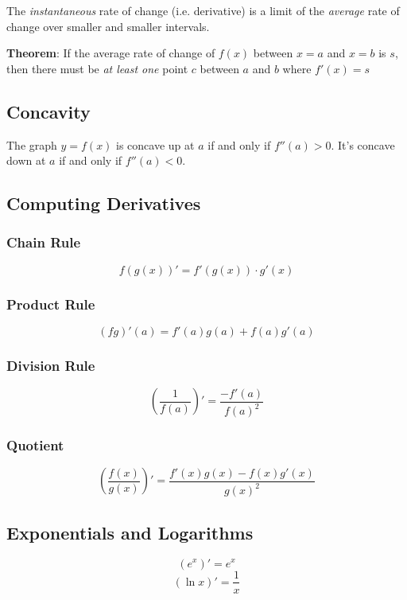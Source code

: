 \documentclass[12pt, a4paper]{scrartcl}
\begin{document}
The \textit{instantaneous} rate of change (i.e. derivative) is a limit of the \textit{average} rate of change over smaller and smaller intervals.\par
\textbf{Theorem}: If the average rate of change of $f(x)$ between $x = a$ and $x = b$ is $s$, then there must be \textit{at least one} point $c$ between $a$ and $b$ where $f'(x)=s$

\subsection{Concavity}
\label{sec:derivatives:concavity}

The graph $y = f(x)$ is concave up at $a$ if and only if  $f''(a) > 0$.	It's concave down at $a$ if and only if $f''(a) < 0$.

\subsection{Computing Derivatives}
\label{sec:derivatives:computing}

\subsubsection{Chain Rule}
\label{sec:derivatives:computing:chain_rule}
$$f(g(x))' = f'(g(x)) \cdot g'(x)$$

\subsubsection{Product Rule}
\label{sec:derivatives:computing:product}

$$(fg)'(a)=f'(a)g(a) + f(a)g'(a)$$

\subsubsection{Division Rule}
\label{sec:derivatives:computing:division}

$$(\dfrac{1}{f(a)})' = \dfrac{-f'(a)}{f(a)^2}$$

\subsubsection{Quotient}
\label{sec:derivatives:computing:quotient}

$$(\dfrac{f(x)}{g(x)})'=\dfrac{f'(x)g(x) - f(x)g'(x)}{g(x)^2}$$

\subsection{Exponentials and Logarithms}
\label{sec:derivatives:exp}
$$(e^x)' = e^x$$
$$(\ln x)' = \dfrac{1}{x}$$
\end{document}
